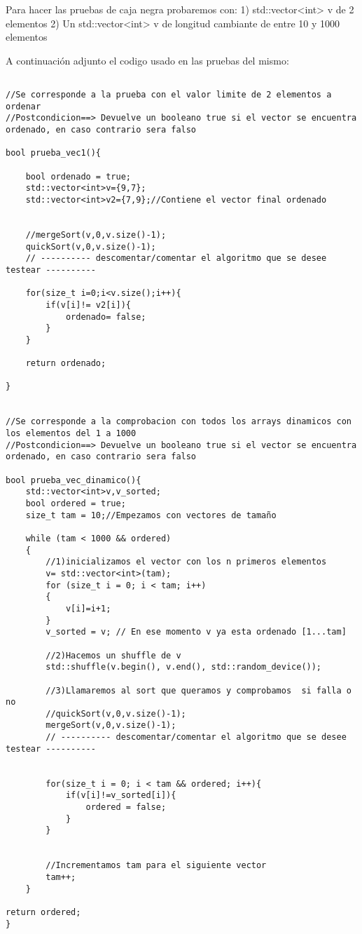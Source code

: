 Para hacer las pruebas de caja negra probaremos con:
1) std::vector<int> v de 2 elementos
2) Un std::vector<int> v de longitud cambiante de entre 10 y 1000 elementos 

A continuación adjunto el codigo usado en las pruebas del mismo:

\begin{lstlisting}

//Se corresponde a la prueba con el valor limite de 2 elementos a ordenar
//Postcondicion==> Devuelve un booleano true si el vector se encuentra ordenado, en caso contrario sera falso

bool prueba_vec1(){
    
    bool ordenado = true; 
    std::vector<int>v={9,7};
    std::vector<int>v2={7,9};//Contiene el vector final ordenado

    
    //mergeSort(v,0,v.size()-1);
    quickSort(v,0,v.size()-1);
    // ---------- descomentar/comentar el algoritmo que se desee testear ---------- 
    
    for(size_t i=0;i<v.size();i++){
        if(v[i]!= v2[i]){
            ordenado= false;
        }
    }
    
    return ordenado;

}


//Se corresponde a la comprobacion con todos los arrays dinamicos con los elementos del 1 a 1000
//Postcondicion==> Devuelve un booleano true si el vector se encuentra ordenado, en caso contrario sera falso

bool prueba_vec_dinamico(){
    std::vector<int>v,v_sorted;
    bool ordered = true;
    size_t tam = 10;//Empezamos con vectores de tamaño

    while (tam < 1000 && ordered)
    {   
        //1)inicializamos el vector con los n primeros elementos
        v= std::vector<int>(tam);
        for (size_t i = 0; i < tam; i++)
        {
            v[i]=i+1;
        }
        v_sorted = v; // En ese momento v ya esta ordenado [1...tam]
        
        //2)Hacemos un shuffle de v
        std::shuffle(v.begin(), v.end(), std::random_device());
        
        //3)Llamaremos al sort que queramos y comprobamos  si falla o no
        //quickSort(v,0,v.size()-1);
        mergeSort(v,0,v.size()-1);
        // ---------- descomentar/comentar el algoritmo que se desee testear ---------- 
    

        for(size_t i = 0; i < tam && ordered; i++){
            if(v[i]!=v_sorted[i]){
                ordered = false;
            }
        }


        //Incrementamos tam para el siguiente vector
        tam++;
    }
    
return ordered;
}
\end{lstlisting}